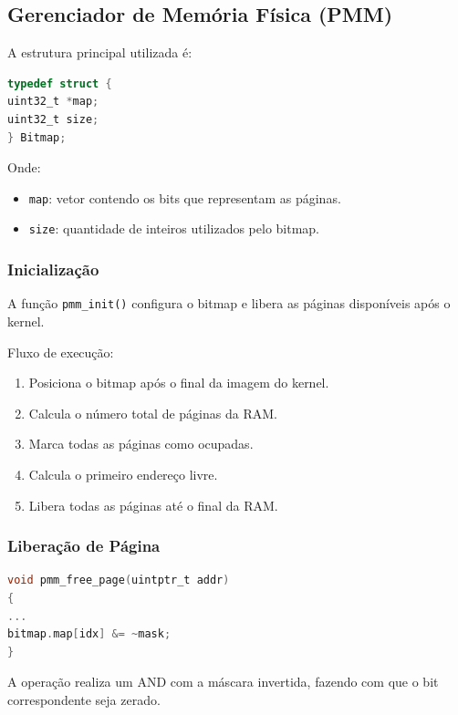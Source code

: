 \subsection{Gerenciador de Memória Física (PMM)}

A estrutura principal utilizada é:

\begin{lstlisting}[language=C]
typedef struct {
uint32_t *map;
uint32_t size;
} Bitmap;
\end{lstlisting}

Onde:

\begin{itemize}
\item \texttt{map}: vetor contendo os bits que representam as páginas.
\item \texttt{size}: quantidade de inteiros utilizados pelo bitmap.
\end{itemize}

\subsubsection{Inicialização}

A função \texttt{pmm\_init()} configura o bitmap e libera as páginas disponíveis após o kernel.

Fluxo de execução:

\begin{enumerate}
\item Posiciona o bitmap após o final da imagem do kernel.
\item Calcula o número total de páginas da RAM.
\item Marca todas as páginas como ocupadas.
\item Calcula o primeiro endereço livre.
\item Libera todas as páginas até o final da RAM.
\end{enumerate}

\subsubsection{Liberação de Página}

\begin{lstlisting}[language=C]
void pmm_free_page(uintptr_t addr)
{
...
bitmap.map[idx] &= ~mask;
}
\end{lstlisting}

A operação realiza um AND com a máscara invertida, fazendo com que o bit correspondente seja zerado.

